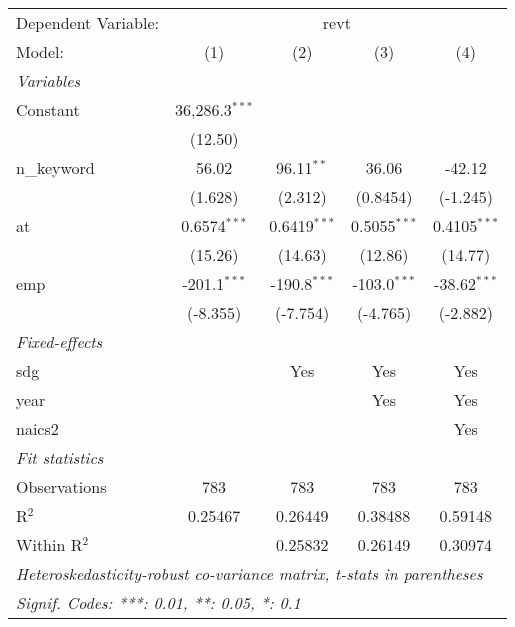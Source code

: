 
\begingroup
\centering
\begin{tabular}{lcccc}
   \tabularnewline \midrule \midrule
   Dependent Variable: & \multicolumn{4}{c}{revt}\\
   Model:       & (1)              & (2)            & (3)            & (4)\\  
   \midrule
   \emph{Variables}\\
   Constant     & 36,286.3$^{***}$ &                &                &   \\   
                & (12.50)          &                &                &   \\   
   n\_keyword   & 56.02            & 96.11$^{**}$   & 36.06          & -42.12\\   
                & (1.628)          & (2.312)        & (0.8454)       & (-1.245)\\   
   at           & 0.6574$^{***}$   & 0.6419$^{***}$ & 0.5055$^{***}$ & 0.4105$^{***}$\\   
                & (15.26)          & (14.63)        & (12.86)        & (14.77)\\   
   emp          & -201.1$^{***}$   & -190.8$^{***}$ & -103.0$^{***}$ & -38.62$^{***}$\\   
                & (-8.355)         & (-7.754)       & (-4.765)       & (-2.882)\\   
   \midrule
   \emph{Fixed-effects}\\
   sdg          &                  & Yes            & Yes            & Yes\\  
   year         &                  &                & Yes            & Yes\\  
   naics2       &                  &                &                & Yes\\  
   \midrule
   \emph{Fit statistics}\\
   Observations & 783              & 783            & 783            & 783\\  
   R$^2$        & 0.25467          & 0.26449        & 0.38488        & 0.59148\\  
   Within R$^2$ &                  & 0.25832        & 0.26149        & 0.30974\\  
   \midrule \midrule
   \multicolumn{5}{l}{\emph{Heteroskedasticity-robust co-variance matrix, t-stats in parentheses}}\\
   \multicolumn{5}{l}{\emph{Signif. Codes: ***: 0.01, **: 0.05, *: 0.1}}\\
\end{tabular}
\par\endgroup


